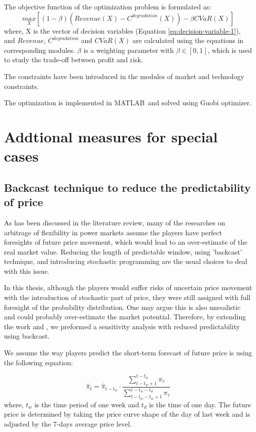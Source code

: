 The objective function of the optimization problem is formulated as:
\begin{equation}
\underset{X}{max} \left[ (1-\beta)\left(Revenue (X) - C^{degradation}(X)\right) - \beta CVaR(X) \right]
\end{equation}
where, X is the vector of decision variables (Equation \eqref{eq:decision-variable-1}), and $Revenue$, $C^{degradation}$ and $CVaR(X)$ are calculated using the equations in corresponding modules. $\beta$ is a weighting parameter with $\beta \in [0,1]$, which is used to study the trade-off between profit and risk.

The constraints have been introduced in the modules of market and technology constraints.

The optimization is implemented in MATLAB\textcopyright~and solved using Guobi optimizer. 

\section{Addtional measures for special cases}
\label{sec:special}

\subsection{Backcast technique to reduce the predictability of price}
As has been discussed in the literature review, many of the researches on arbitrage of flexibility in power markets assume the players have perfect foresights of future price movement, which would lead to an over-estimate of the real market value. Reducing the length of predictable window, using 'backcast' technique, and introducing stochastic programming are the usual choices to deal with this issue.

In this thesis, although the players would suffer risks of uncertain price movement with the introduction of stochastic part of price, they were still assigned with full foresight of the probability distribution. One may argue this is also unrealistic and could probably over-estimate the market potential. Therefore, by extending the work \cite{Drury2011} and \cite{Sioshansi2009}, we preformed a sensitivity analysis with reduced predictability using backcast.

We assume the way players predict the short-term forecast of future price is using the following equation:

\begin{equation}
\hat{\pi}_t = \hat{\pi}_{t-t_w} \cdot \frac{\sum_{t-t_w+1}^{t-t_d}\pi_{\tau}}{\sum_{t-t_w-t_w+1}^{t-t_w - t_d}\pi_{\tau}}
\end{equation}
where, $t_w$ is the time period of one week and $t_d$ is the time of one day. The future price is determined by taking the price curve shape of the day of last week and is adjusted by the 7-days average price level.

